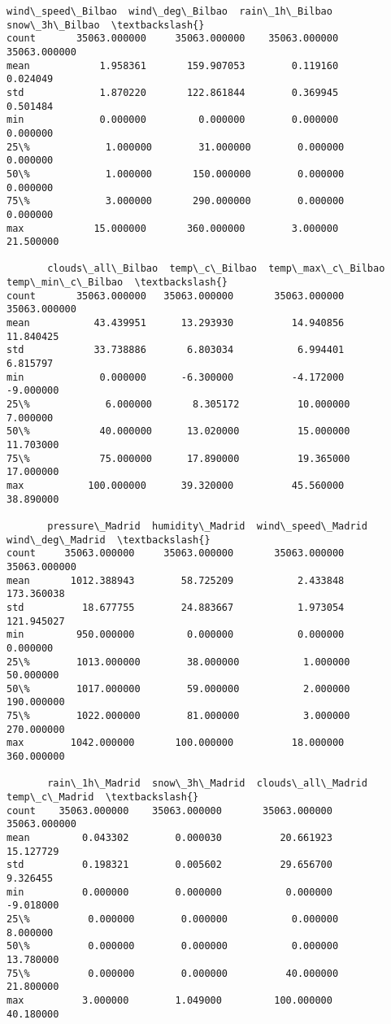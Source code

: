 \documentclass[11pt]{article}
\begin{document}
\begin{tcolorbox}[breakable, size=fbox, boxrule=.5pt, pad at break*=1mm, opacityfill=0]
\begin{Verbatim}[commandchars=\\\{\}]
       wind\_speed\_Bilbao  wind\_deg\_Bilbao  rain\_1h\_Bilbao  snow\_3h\_Bilbao  \textbackslash{}
count       35063.000000     35063.000000    35063.000000    35063.000000
mean            1.958361       159.907053        0.119160        0.024049
std             1.870220       122.861844        0.369945        0.501484
min             0.000000         0.000000        0.000000        0.000000
25\%             1.000000        31.000000        0.000000        0.000000
50\%             1.000000       150.000000        0.000000        0.000000
75\%             3.000000       290.000000        0.000000        0.000000
max            15.000000       360.000000        3.000000       21.500000

       clouds\_all\_Bilbao  temp\_c\_Bilbao  temp\_max\_c\_Bilbao  temp\_min\_c\_Bilbao  \textbackslash{}
count       35063.000000   35063.000000       35063.000000       35063.000000
mean           43.439951      13.293930          14.940856          11.840425
std            33.738886       6.803034           6.994401           6.815797
min             0.000000      -6.300000          -4.172000          -9.000000
25\%             6.000000       8.305172          10.000000           7.000000
50\%            40.000000      13.020000          15.000000          11.703000
75\%            75.000000      17.890000          19.365000          17.000000
max           100.000000      39.320000          45.560000          38.890000

       pressure\_Madrid  humidity\_Madrid  wind\_speed\_Madrid  wind\_deg\_Madrid  \textbackslash{}
count     35063.000000     35063.000000       35063.000000     35063.000000
mean       1012.388943        58.725209           2.433848       173.360038
std          18.677755        24.883667           1.973054       121.945027
min         950.000000         0.000000           0.000000         0.000000
25\%        1013.000000        38.000000           1.000000        50.000000
50\%        1017.000000        59.000000           2.000000       190.000000
75\%        1022.000000        81.000000           3.000000       270.000000
max        1042.000000       100.000000          18.000000       360.000000

       rain\_1h\_Madrid  snow\_3h\_Madrid  clouds\_all\_Madrid  temp\_c\_Madrid  \textbackslash{}
count    35063.000000    35063.000000       35063.000000   35063.000000
mean         0.043302        0.000030          20.661923      15.127729
std          0.198321        0.005602          29.656700       9.326455
min          0.000000        0.000000           0.000000      -9.018000
25\%          0.000000        0.000000           0.000000       8.000000
50\%          0.000000        0.000000           0.000000      13.780000
75\%          0.000000        0.000000          40.000000      21.800000
max          3.000000        1.049000         100.000000      40.180000


\end{Verbatim}
\end{tcolorbox}
\end{document}
